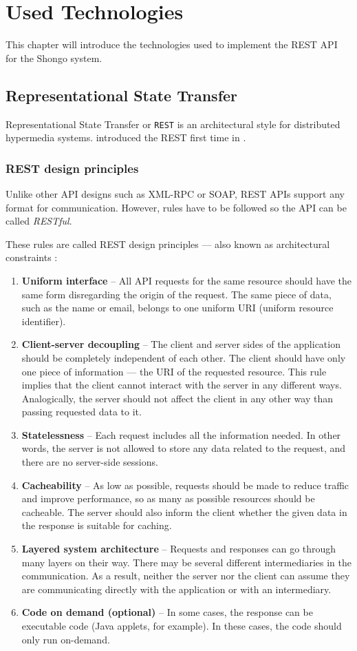 \chapter{Used Technologies} \label{cha:technologies}
This chapter will introduce the technologies used to implement the REST API for the Shongo system.


\section{Representational State Transfer} \label{rest}
Representational State Transfer or \texttt{REST} is an architectural style for distributed hypermedia systems. \citeauthor{fielding2000rest} introduced the REST first time in \citeyear{fielding2000rest} \cite{fielding2000rest}.
\subsection{REST design principles}
Unlike other API designs such as XML-RPC or SOAP, REST APIs support any format for communication. However, rules have to be followed so the API can be called \emph{RESTful}.

These rules are called REST design principles --- also known as architectural constraints \cite{ibmrest}:
\begin{enumerate}
    \item \textbf{Uniform interface} -- All API requests for the same resource should have the same form disregarding the origin of the request. The same piece of data, such as the name or email, belongs to one uniform URI (uniform resource identifier).
    \item \textbf{Client-server decoupling} -- The client and server sides of the application should be completely independent of each other. The client should have only one piece of information — the URI of the requested resource. This rule implies that the client cannot interact with the server in any different ways. Analogically, the server should not affect the client in any other way than passing requested data to it.
    \item \textbf{Statelessness} -- Each request includes all the information needed. In other words, the server is not allowed to store any data related to the request, and there are no server-side sessions.
    \item \textbf{Cacheability} -- As low as possible, requests should be made to reduce traffic and improve performance, so as many as possible resources should be cacheable. The server should also inform the client whether the given data in the response is suitable for caching.
    \item \textbf{Layered system architecture} -- Requests and responses can go through many layers on their way. There may be several different intermediaries in the communication. As a result, neither the server nor the client can assume they are communicating directly with the application or with an intermediary.
    \item \textbf{Code on demand (optional)} -- In some cases, the response can be executable code (Java applets, for example). In these cases, the code should only run on-demand.
\end{enumerate}


